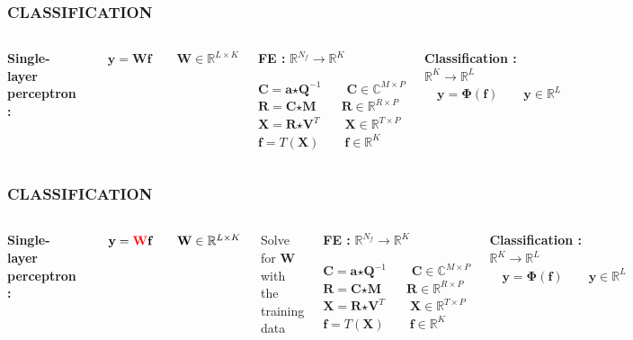\documentclass{beamer}
\begin{document}
\begin{frame}
\frametitle{CLASSIFICATION}
\begin{columns}[c]
\textbf{Single-layer perceptron :}
\bigskip

$\quad \textbf{y} = \textbf{W}\textbf{f} \qquad \textbf{W} \in \mathbb{R}^{L \times K}$

\begin{block}{\textbf{FE :} $\mathbb{R}^{N_{f}} \rightarrow \mathbb{R}^{K}$}

$\textbf{C} = \textbf{a} \bm{\star} \textbf{Q}^{-1} \qquad \textbf{C} \in \mathbb{C}^{M \times P}$\\
$\textbf{R} = \textbf{C} \bm{\star} \textbf{M} \qquad \textbf{R} \in \mathbb{R}^{R \times P}$\\
$\textbf{X} = \textbf{R} \bm{\star} \textbf{V}^{T} \qquad \textbf{X} \in \mathbb{R}^{T \times P}$\\
$\textbf{f} = T(\textbf{X}) \qquad \textbf{f} \in \mathbb{R}^{K}$\\
\end{block}
\begin{block}{\textbf{Classification :} $\mathbb{R}^{K} \rightarrow \mathbb{R}^{L}$}
$\quad \textbf{y} = \bm{\Phi}(\textbf{f}) \qquad \textbf{y} \in \mathbb{R}^{L}$
\end{block}
\end{columns}
\end{frame}

\begin{frame}
\frametitle{CLASSIFICATION}
\begin{columns}[c]
\textbf{Single-layer perceptron :}
\bigskip

$\quad \textbf{y} = \textbf{{\color{red}W}}\textbf{f} \qquad \textbf{W} \in \mathbb{R}^{L \times K}$\\
\bigskip

Solve for \textbf{{\color{red}W}} with the training data

\begin{block}{\textbf{FE :} $\mathbb{R}^{N_{f}} \rightarrow \mathbb{R}^{K}$}

$\textbf{C} = \textbf{a} \bm{\star} \textbf{Q}^{-1} \qquad \textbf{C} \in \mathbb{C}^{M \times P}$\\
$\textbf{R} = \textbf{C} \bm{\star} \textbf{M} \qquad \textbf{R} \in \mathbb{R}^{R \times P}$\\
$\textbf{X} = \textbf{R} \bm{\star} \textbf{V}^{T} \qquad \textbf{X} \in \mathbb{R}^{T \times P}$\\
$\textbf{f} = T(\textbf{X}) \qquad \textbf{f} \in \mathbb{R}^{K}$\\
\end{block}
\begin{block}{\textbf{Classification :} $\mathbb{R}^{K} \rightarrow \mathbb{R}^{L}$}
$\quad \textbf{y} = \bm{\Phi}(\textbf{f}) \qquad \textbf{y} \in \mathbb{R}^{L}$
\end{block}
\end{columns}
\end{frame}
\end{document}
